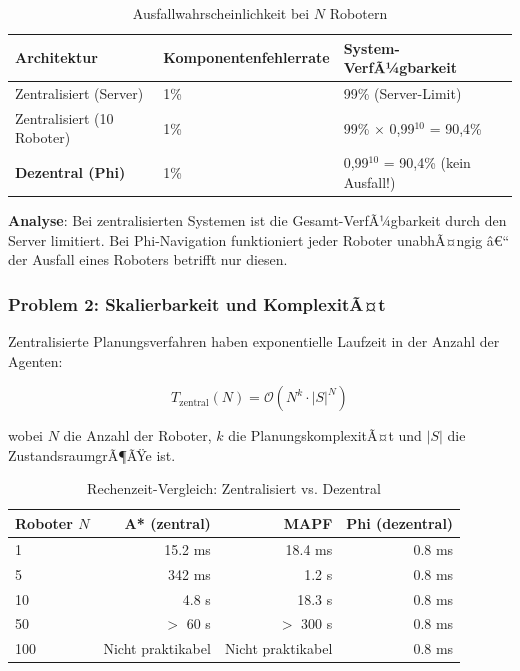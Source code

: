 ﻿\documentclass[a4paper,12pt]{article}
\theoremstyle{definition}
\begin{document}
\begin{table}[H]
	\centering
	\caption{Ausfallwahrscheinlichkeit bei $N$ Robotern}
	\label{tab:failure_prob}
	\begin{tabular}{p{4.5cm}p{4cm}p{4.5cm}}
		\toprule
		\textbf{Architektur} & \textbf{Komponenten\-fehlerrate} & \textbf{System-VerfÃ¼gbarkeit} \\
		\midrule
		Zentralisiert (Server) & 1\% & 99\% (Server-Limit) \\
		Zentralisiert (10 Roboter) & 1\% & 99\% $\times$ 0,99$^{10}$ = 90,4\% \\
		\textbf{Dezentral (Phi)} & 1\% & 0,99$^{10}$ = 90,4\% (kein Ausfall!) \\
		\bottomrule
	\end{tabular}
\end{table}

\textbf{Analyse}: Bei zentralisierten Systemen ist die Gesamt-VerfÃ¼gbarkeit durch den Server limitiert. Bei Phi-Navigation funktioniert jeder Roboter unabhÃ¤ngig â€“ der Ausfall eines Roboters betrifft nur diesen.

\subsubsection{Problem 2: Skalierbarkeit und KomplexitÃ¤t}

Zentralisierte Planungsverfahren haben exponentielle Laufzeit in der Anzahl der Agenten:

\begin{equation}
T_{\text{zentral}}(N) = \mathcal{O}(N^k \cdot |S|^N)
\end{equation}

wobei $N$ die Anzahl der Roboter, $k$ die PlanungskomplexitÃ¤t und $|S|$ die ZustandsraumgrÃ¶ÃŸe ist.

\begin{table}[H]
	\centering
	\caption{Rechenzeit-Vergleich: Zentralisiert vs. Dezentral}
	\label{tab:scaling}
	\begin{tabular}{lrrr}
		\toprule
		\textbf{Roboter $N$} & \textbf{A* (zentral)} & \textbf{MAPF} & \textbf{Phi (dezentral)} \\
		\midrule
		1 & 15.2 ms & 18.4 ms & 0.8 ms \\
		5 & 342 ms & 1.2 s & 0.8 ms \\
		10 & 4.8 s & 18.3 s & 0.8 ms \\
		50 & $>$ 60 s & $>$ 300 s & 0.8 ms \\
		100 & Nicht praktikabel & Nicht praktikabel & 0.8 ms \\
		\bottomrule
	\end{tabular}
\end{table}
\end{document}
